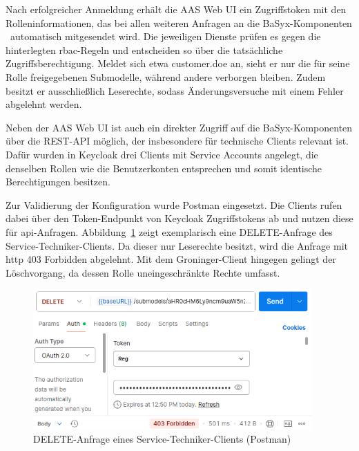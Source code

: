 \vspace{-0.35em}

Nach erfolgreicher Anmeldung erhält die AAS Web UI ein Zugriffstoken mit den Rolleninformationen, das bei allen weiteren Anfragen an die BaSyx-Komponenten%
\pagebreak
~automatisch mitgesendet wird.
Die jeweiligen Dienste prüfen es gegen die hinterlegten \acs{rbac}-Regeln und entscheiden so über die tatsächliche Zugriffsberechtigung.
Meldet sich etwa customer.doe an, sieht er nur die für seine Rolle freigegebenen Submodelle, während andere verborgen bleiben.
Zudem besitzt er ausschließlich Leserechte, sodass Änderungsversuche mit einem Fehler abgelehnt werden.

Neben der AAS Web UI ist auch ein direkter Zugriff auf die BaSyx-Komponenten über die REST-API möglich, der insbesondere für technische Clients relevant ist. 
Dafür wurden in Keycloak drei Clients mit Service Accounts angelegt, die denselben Rollen wie die Benutzerkonten entsprechen und somit identische Berechtigungen besitzen.

Zur Validierung der Konfiguration wurde Postman eingesetzt. 
Die Clients rufen dabei über den Token-Endpunkt von Keycloak Zugriffstokens ab und nutzen diese für \acs{api}-Anfragen. 
Abbildung~\ref{fig:DELETEServiceTechniker} zeigt exemplarisch eine DELETE-Anfrage des Service-Techniker-Clients. 
Da dieser nur Leserechte besitzt, wird die Anfrage mit \acs{http} 403 Forbidden abgelehnt. 
Mit dem Groninger-Client hingegen gelingt der Löschvorgang, da dessen Rolle uneingeschränkte Rechte umfasst.

\vspace{0.25em}
\begin{figure}[htbp]
    \centering
        \includegraphics[width=0.95\textwidth]{Bilder/Ergebnisse/DPP/Postman/TechnicianDelet.png}
    \caption[DELETE-Anfrage eines Service-Techniker-Clients]{DELETE-Anfrage eines Service-Techniker-Clients (Postman)}
    \label{fig:DELETEServiceTechniker}
\end{figure}
\vspace{-0.25em}

